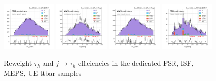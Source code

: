 \begin{figure}
    
    \includegraphics[width=0.24\textwidth]{appendices/qcdSF/figures/mutau_>=2_>=2_dilepton_mass.png}
    \includegraphics[width=0.24\textwidth]{appendices/qcdSF/figures/mutau_ss_>=2_>=2_dilepton_mass.png}
    \includegraphics[width=0.24\textwidth]{appendices/qcdSF/figures/etau_>=2_>=2_dilepton_mass.png}
    \includegraphics[width=0.24\textwidth]{appendices/qcdSF/figures/etau_ss_>=2_>=2_dilepton_mass.png}
    
    

    \caption{Reweight $\tau_h$ and $j \to \tau_h$ efficiencies in the dedicated FSR, ISF, MEPS, UE ttbar samples}
    \label{fig:appendix:qcdsf:ltau}
\end{figure}



